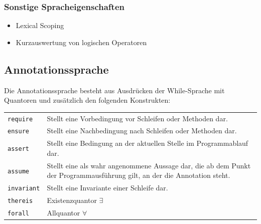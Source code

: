\documentclass[a4paper,10pt]{article}
\begin{document}
\subsubsection{Sonstige Spracheigenschaften}
\begin{itemize}
  \item Lexical Scoping
  \item Kurzauswertung von logischen Operatoren
\end{itemize}


\subsection{Annotationssprache}
Die Annotationssprache besteht aus Ausdr\"{u}cken der While-Sprache mit Quantoren und zus\"{a}tzlich den folgenden Konstrukten:\\
\begin{tabularx}{\textwidth}{| l | X |}
\hline
\texttt{require} & Stellt eine Vorbedingung vor Schleifen oder Methoden dar.\\
\texttt{ensure} & Stellt eine Nachbedingung nach Schleifen oder Methoden dar.\\
\texttt{assert} & Stellt eine Bedingung an der aktuellen Stelle im Programmablauf dar.\\
\texttt{assume} & Stellt eine als wahr angenommene Aussage dar, die ab dem Punkt der Programmausf\"{u}hrung gilt, an der die Annotation steht.\\
\texttt{invariant} & Stellt eine Invariante einer Schleife dar.\\
\hline
\texttt{thereis} & Existenzquantor $\exists$\\
\texttt{forall} & Allquantor $\forall$\\
\hline
\end{tabularx}

\newpage
\end{document}
